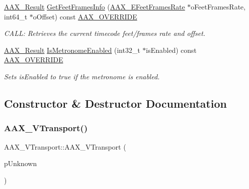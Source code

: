 \begin{DoxyCompactItemize}
\mbox{\hyperlink{a00392_a4d8f69a697df7f70c3a8e9b8ee130d2f}{A\+A\+X\+\_\+\+Result}} \mbox{\hyperlink{a01941_ad830bf73d2fd4b7b22454c885e799e59}{Get\+Feet\+Frames\+Info}} (\mbox{\hyperlink{a00491_a8a0c9dafef741a26ee8c06f7285a0dfa}{A\+A\+X\+\_\+\+E\+Feet\+Frames\+Rate}} $\ast$o\+Feet\+Frames\+Rate, int64\+\_\+t $\ast$o\+Offset) const \mbox{\hyperlink{a00392_ac2f24a5172689ae684344abdcce55463}{A\+A\+X\+\_\+\+O\+V\+E\+R\+R\+I\+DE}}
\begin{DoxyCompactList}\small\item\em C\+A\+LL\+: Retrieves the current timecode feet/frames rate and offset. \end{DoxyCompactList}\item 
\mbox{\hyperlink{a00392_a4d8f69a697df7f70c3a8e9b8ee130d2f}{A\+A\+X\+\_\+\+Result}} \mbox{\hyperlink{a01941_af5755db2dc7d6150dd4df19f536c4a40}{Is\+Metronome\+Enabled}} (int32\+\_\+t $\ast$is\+Enabled) const \mbox{\hyperlink{a00392_ac2f24a5172689ae684344abdcce55463}{A\+A\+X\+\_\+\+O\+V\+E\+R\+R\+I\+DE}}
\begin{DoxyCompactList}\small\item\em Sets is\+Enabled to true if the metronome is enabled. \end{DoxyCompactList}\end{DoxyCompactItemize}


\subsection{Constructor \& Destructor Documentation}
\mbox{\label{a01941_a8ce1b37bff86703b1aa542917dbe4bf9}} 
\subsubsection{\texorpdfstring{AAX\_VTransport()}{AAX\_VTransport()}}
{\footnotesize\ttfamily A\+A\+X\+\_\+\+V\+Transport\+::\+A\+A\+X\+\_\+\+V\+Transport (\begin{DoxyParamCaption}\item[{\mbox{\hyperlink{a01409}{I\+A\+C\+F\+Unknown}} $\ast$}]{p\+Unknown }\end{DoxyParamCaption})}

\mbox{\label{a01941_a3b5f278e1065e3dbbb6acffb54aaffec}} 
